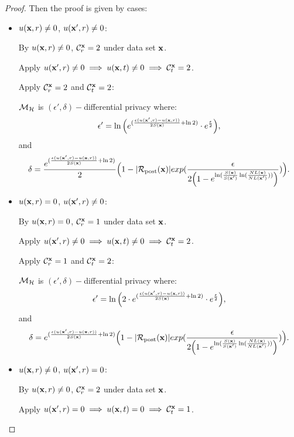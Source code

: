 \documentclass{article}
\begin{document}
\begin{proof}
 Then the proof is given by cases:
  \begin{itemize}
    \item {\boldmath$u(\textbf{x}, {r}) \neq 0$, $u(\textbf{x}', {r}) \neq 0$}:

      By $u(\textbf{x}, {r}) \neq 0$, $\mathcal{C}^{\textbf{x}}_{r} = 2$ under data set $\textbf{x}$.

      Apply $u(\textbf{x}', {r}) \neq 0 \implies u(\textbf{x}, {t}) \neq 0 \implies \mathcal{C}^{\textbf{x}}_{t} = 2$.

      Apply  $\mathcal{C}^{\textbf{x}}_{r} = 2$ and  $\mathcal{C}^{\textbf{x}}_{t} = 2$:

      $\mathcal{M}_{\mathcal{H}}$ is $(\epsilon', \delta)-$differential privacy where:
      $$
      \epsilon' = \ln \Big( e^{(\frac{\epsilon (u(\textbf{x}', {r}) - u(\textbf{x}, {r}))}{2 S(\textbf{x})} + \ln 2)} \cdot e^{\frac{\epsilon}{2}} \Big),
      $$ and
      $$
      \delta = \frac{e^{(\frac{\epsilon (u(\textbf{x}', {r}) - u(\textbf{x}, {r}))}{2 S(\textbf{x})} + \ln 2)}}{2}
      \Big( 1 - |\mathcal{R}_{\textup{post}}(\textbf{x})|exp(\frac{\epsilon}{2 \Big(1 - e ^ {\ln(\frac{S(\textbf{x})}{S(\textbf{x}')} \ln(\frac{NL(\textbf{x})}{NL(\textbf{x}')}))} \Big)}) \Big).
      $$ 

    \item {\boldmath$u(\textbf{x}, {r}) = 0$, $u(\textbf{x}', {r}) \neq 0$}:

      By $u(\textbf{x}, {r}) = 0$, $\mathcal{C}^{\textbf{x}}_{r} = 1$ under data set $\textbf{x}$.
      
      Apply $u(\textbf{x}', {r}) \neq 0 \implies u(\textbf{x}, {t}) \neq 0 \implies \mathcal{C}^{\textbf{x}}_{t} = 2$.

      Apply  $\mathcal{C}^{\textbf{x}}_{r} = 1$ and  $\mathcal{C}^{\textbf{x}}_{t} = 2$:

      $\mathcal{M}_{\mathcal{H}}$ is $(\epsilon', \delta)-$differential privacy where:
      $$
      \epsilon' = \ln \Big( 2 \cdot e^{(\frac{\epsilon (u(\textbf{x}', {r}) - u(\textbf{x}, {r}))}{2 S(\textbf{x})} + \ln 2)} \cdot e^{\frac{\epsilon}{2}} \Big),
      $$ and
      $$
      \delta = e^{(\frac{\epsilon (u(\textbf{x}', {r}) - u(\textbf{x}, {r}))}{2 S(\textbf{x})} + \ln 2)}
      \Big( 1 - |\mathcal{R}_{\textup{post}}(\textbf{x})|exp(\frac{\epsilon}{2 \Big( 1 - e ^ {\ln(\frac{S(\textbf{x})}{S(\textbf{x}')} \ln(\frac{NL(\textbf{x})}{NL(\textbf{x}')}))}\Big) }) \Big).
      $$ 
      

    \item {\boldmath$u(\textbf{x}, {r}) \neq 0$, $u(\textbf{x}', {r}) = 0$}:

      By $u(\textbf{x}, {r}) \neq 0$, $\mathcal{C}^{\textbf{x}}_{r} = 2$ under data set $\textbf{x}$.
      
      Apply $u(\textbf{x}', {r}) = 0 \implies u(\textbf{x}, {t}) = 0 \implies \mathcal{C}^{\textbf{x}}_{t} = 1$.


\end{itemize}
\end{proof}
\end{document}
